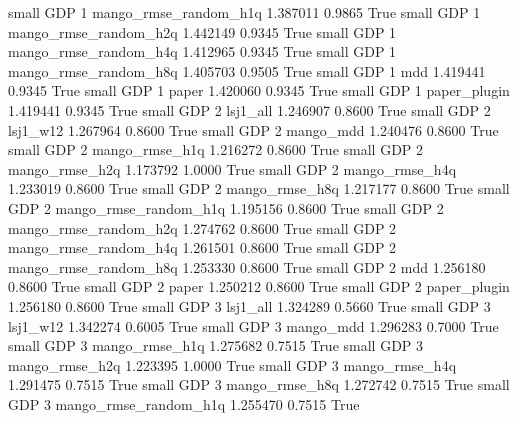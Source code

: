      small      GDP                 1 mango_rmse_random_h1q   1.387011      0.9865    True
     small      GDP                 1 mango_rmse_random_h2q   1.442149      0.9345    True
     small      GDP                 1 mango_rmse_random_h4q   1.412965      0.9345    True
     small      GDP                 1 mango_rmse_random_h8q   1.405703      0.9505    True
     small      GDP                 1                   mdd   1.419441      0.9345    True
     small      GDP                 1                 paper   1.420060      0.9345    True
     small      GDP                 1          paper_plugin   1.419441      0.9345    True
     small      GDP                 2              lsj1_all   1.246907      0.8600    True
     small      GDP                 2              lsj1_w12   1.267964      0.8600    True
     small      GDP                 2             mango_mdd   1.240476      0.8600    True
     small      GDP                 2        mango_rmse_h1q   1.216272      0.8600    True
     small      GDP                 2        mango_rmse_h2q   1.173792      1.0000    True
     small      GDP                 2        mango_rmse_h4q   1.233019      0.8600    True
     small      GDP                 2        mango_rmse_h8q   1.217177      0.8600    True
     small      GDP                 2 mango_rmse_random_h1q   1.195156      0.8600    True
     small      GDP                 2 mango_rmse_random_h2q   1.274762      0.8600    True
     small      GDP                 2 mango_rmse_random_h4q   1.261501      0.8600    True
     small      GDP                 2 mango_rmse_random_h8q   1.253330      0.8600    True
     small      GDP                 2                   mdd   1.256180      0.8600    True
     small      GDP                 2                 paper   1.250212      0.8600    True
     small      GDP                 2          paper_plugin   1.256180      0.8600    True
     small      GDP                 3              lsj1_all   1.324289      0.5660    True
     small      GDP                 3              lsj1_w12   1.342274      0.6005    True
     small      GDP                 3             mango_mdd   1.296283      0.7000    True
     small      GDP                 3        mango_rmse_h1q   1.275682      0.7515    True
     small      GDP                 3        mango_rmse_h2q   1.223395      1.0000    True
     small      GDP                 3        mango_rmse_h4q   1.291475      0.7515    True
     small      GDP                 3        mango_rmse_h8q   1.272742      0.7515    True
     small      GDP                 3 mango_rmse_random_h1q   1.255470      0.7515    True
